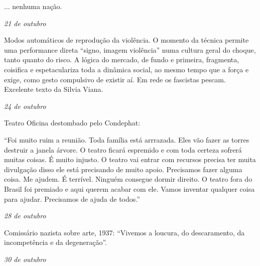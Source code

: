 ... nenhuma nação.

\begin{flushright}
\emph{21 de outubro}
\end{flushright}

Modos automáticos de reprodução da violência. O momento da técnica
permite uma performance direta ``signo, imagem violência'' numa cultura
geral do choque, tanto quanto do risco. A lógica do mercado, de fundo e
primeira, fragmenta, coisifica e espetaculariza toda a dinâmica social,
ao mesmo tempo que a força e exige, como gesto compulsivo de existir aí.
Em rede os fascistas pescam. Excelente texto da Silvia Viana.

\begin{flushright}
\emph{24 de outubro}
\end{flushright}

Teatro Oficina destombado pelo Condephat:

``Foi muito ruim a reunião. Toda família está arrrazada. Eles vão fazer
as torres destruir a janela árvore. O teatro ficará espremido e com toda
certeza sofrerá muitas coisas. É muito injusto. O teatro vai entrar com
recursos precisa ter muita divulgação disso ele está precisando de muito
apoio. Precisamos fazer alguma coisa. Me ajudem. É terrível. Ninguém
consegue dormir direito. O teatro fora do Brasil foi premiado e aqui
querem acabar com ele. Vamos inventar qualquer coisa para ajudar.
Precisamos de ajuda de todos.''

\begin{flushright}
\emph{28 de outubro}
\end{flushright}

Comissário nazista sobre arte, 1937: ``Vivemos a loucura, do
descaramento, da incompetência e da degeneração''.

\begin{flushright}
\emph{30 de outubro}
\end{flushright}

